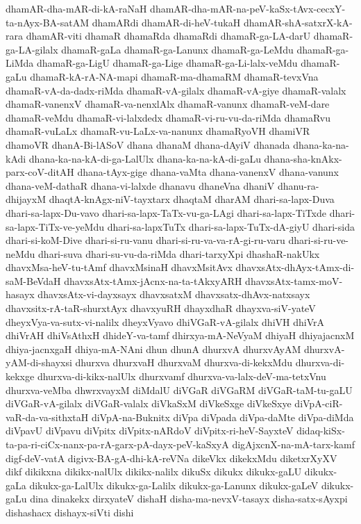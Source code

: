 {dhamAR-dha-mAR-di-kA-raNaH
dhamAR-dha-mAR-na-peV-kaSx-tAvx-cecxY-ta-nAyx-BA-satAM
dhamARdi
dhamAR-di-heV-tukaH
dhamAR-shA-satxrX-kA-rara
dhamAR-viti
dhamaR
dhamaRda
dhamaRdi
dhamaR-ga-LA-darU
dhamaR-ga-LA-gilalx
dhamaR-gaLa
dhamaR-ga-Lanunx
dhamaR-ga-LeMdu
dhamaR-ga-LiMda
dhamaR-ga-LigU
dhamaR-ga-Lige
dhamaR-ga-Li-lalx-veMdu
dhamaR-gaLu
dhamaR-kA-rA-NA-mapi
dhamaR-ma-dhamaRM
dhamaR-tevxVna
dhamaR-vA-da-dadx-riMda
dhamaR-vA-gilalx
dhamaR-vA-giye
dhamaR-valalx
dhamaR-vanenxV
dhamaR-va-nenxlAlx
dhamaR-vanunx
dhamaR-veM-dare
dhamaR-veMdu
dhamaR-vi-lalxdedx
dhamaR-vi-ru-vu-da-riMda
dhamaRvu
dhamaR-vuLaLx
dhamaR-vu-LaLx-va-nanunx
dhamaRyoVH
dhamiVR
dhamoVR
dhanA-Bi-lASoV
dhana
dhanaM
dhana-dAyiV
dhanada
dhana-ka-na-kAdi
dhana-ka-na-kA-di-ga-LalUlx
dhana-ka-na-kA-di-gaLu
dhana-sha-knAkx-parx-coV-ditAH
dhana-tAyx-gige
dhana-vaMta
dhana-vanenxV
dhana-vanunx
dhana-veM-dathaR
dhana-vi-lalxde
dhanavu
dhaneVna
dhaniV
dhanu-ra-dhijayxM
dhaqtA-knAgx-niV-tayxtarx
dhaqtaM
dharAM
dhari-sa-lapx-Duva
dhari-sa-lapx-Du-vavo
dhari-sa-lapx-TaTx-vu-ga-LAgi
dhari-sa-lapx-TiTxde
dhari-sa-lapx-TiTx-ve-yeMdu
dhari-sa-lapxTuTx
dhari-sa-lapx-TuTx-dA-giyU
dhari-sida
dhari-si-koM-Dive
dhari-si-ru-vanu
dhari-si-ru-va-va-rA-gi-ru-varu
dhari-si-ru-ve-neMdu
dhari-suva
dhari-su-vu-da-riMda
dhari-tarxyXpi
dhashaR-nakUkx
dhavxMsa-heV-tu-tAmf
dhavxMsinaH
dhavxMsitAvx
dhavxsAtx-dhAyx-tAmx-di-saM-BeVdaH
dhavxsAtx-tAmx-jAcnx-na-ta-tAkxyARH
dhavxsAtx-tamx-moV-hasayx
dhavxsAtx-vi-dayxsayx
dhavxsatxM
dhavxsatx-dhAvx-natxsayx
dhavxsitx-rA-taR-shurxtAyx
dhavxyuRH
dhayxdhaR
dhayxva-siV-yateV
dheyxVya-va-sutx-vi-nalilx
dheyxVyavo
dhiVGaR-vA-gilalx
dhiVH
dhiVrA
dhiVrAH
dhiVsAthxH
dhideY-va-tamf
dhirxya-mA-NeVyaM
dhiyaH
dhiyajacnxM
dhiya-jacnxgaH
dhiya-mA-NAni
dhun
dhunA
dhurxvA
dhurxvAyAM
dhurxvA-yAM-di-shayxsi
dhurxva
dhurxvaH
dhurxvaM
dhurxva-di-kekxMdu
dhurxva-di-kekxge
dhurxva-di-kikx-nalUlx
dhurxvamf
dhurxva-va-lalx-deV-ma-tetxVnu
dhurxva-veMba
dhwrxvayxM
diMdalU
diVGaR
diVGaRM
diVGaR-taM-tu-gaLU
diVGaR-vA-gilalx
diVGaR-valalx
diVkaSxM
diVkeSxge
diVkeSxye
diVpA-ciR-vaR-da-va-sithxtaH
diVpA-na-Buknitx
diVpa
diVpada
diVpa-daMte
diVpa-diMda
diVpavU
diVpavu
diVpitx
diVpitx-nARdoV
diVpitx-ri-heV-SayxteV
didaq-kiSx-ta-pa-ri-ciCx-nanx-pa-rA-garx-pA-dayx-peV-kaSxyA
digAjxcnX-na-mA-tarx-kamf
digf-deV-vatA
digivx-BA-gA-dhi-kA-reVNa
dikeVkx
dikekxMdu
diketxrXyXV
dikf
dikikxna
dikikx-nalUlx
dikikx-nalilx
dikuSx
dikukx
dikukx-gaLU
dikukx-gaLa
dikukx-ga-LalUlx
dikukx-ga-Lalilx
dikukx-ga-Lanunx
dikukx-gaLeV
dikukx-gaLu
dina
dinakekx
dirxyateV
dishaH
disha-ma-nevxV-tasayx
disha-satx-sAyxpi
dishashacx
dishayx-siVti
dishi
}

